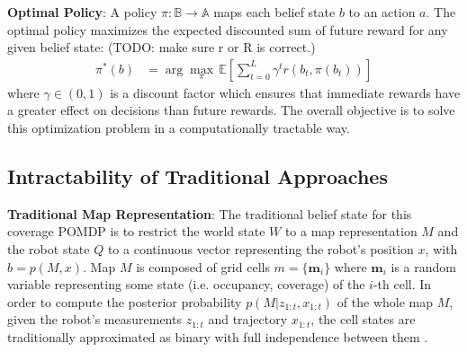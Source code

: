 \documentclass{article}
\newcommand{\ph}[1]{{\textbf{#1}:}} %
\begin{document}
\ph{Optimal Policy} A policy $\pi : \mathbb{B} \rightarrow \mathbb{A}$ maps each belief state $b$ to an action $a$. The optimal policy maximizes the expected discounted sum of future reward for any given belief state: (TODO:  make sure r or R is correct.)
\begin{align}
  \pi^*(b) &= \arg\max_\pi \, \mathbb{E} \left[ \sum_{t=0}^{L} \gamma^t r(b_t, \pi(b_t)) \right]
  \label{eq:optimal_policy}
\end{align}
where $\gamma \in (0,1)$ is a discount factor which ensures that immediate rewards have a greater effect on decisions than future rewards. The overall objective is to solve this optimization problem in a computationally tractable way.


\subsection{Intractability of Traditional Approaches}



\ph{Traditional Map Representation} The traditional belief state for this coverage POMDP is to restrict the world state $W$ to a map representation $M$ and the robot state $Q$ to a continuous vector representing the robot's position $x$, with $b = p(M, x)$. Map $M$ is composed of grid cells  $m = \{\textbf{m}_i\}$ where $\mathbf{m}_i$ is a random variable representing some state (i.e. occupancy, coverage) of the $i$-th cell. In order to compute the posterior probability $p(M | z_{1:t}, x_{1:t})$ of the whole map $M$, given the robot's measurements $z_{1:t}$ and trajectory $x_{1:t}$, the cell states are traditionally approximated as binary with full independence between them \cite{TBF05,elfes1990stochastic}. %
\end{document}
